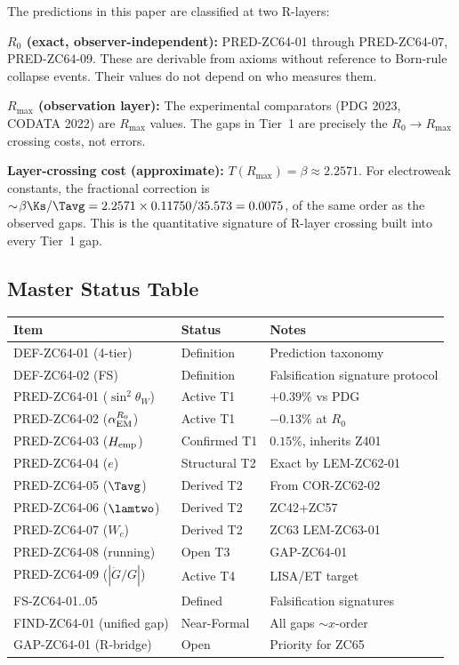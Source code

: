 \documentclass[12pt, a4paper]{article}
\renewcommand{\swsq}{\sin^2\!\theta_W}
\renewcommand{\aEM}{\alpha_{\rm EM}}
\begin{document}
\begin{layerbox}[title={R-Layer Classification of ZC64 Objects}]
The predictions in this paper are classified at two R-layers:

\textbf{$R_0$ (exact, observer-independent):}
PRED-ZC64-01 through PRED-ZC64-07, PRED-ZC64-09.
These are derivable from axioms without reference to
Born-rule collapse events. Their values do not depend
on who measures them.

\textbf{$R_{\max}$ (observation layer):}
The experimental comparators (PDG 2023, CODATA 2022)
are $R_{\max}$ values. The gaps in Tier~1 are precisely
the $R_0 \to R_{\max}$ crossing costs, not errors.

\textbf{Layer-crossing cost (approximate):}
$T(R_{\max}) = \beta \approx 2.2571$.
For electroweak constants, the fractional correction is
$\sim\!\beta\Ks/\Tavg = 2.2571\times 0.11750/35.573 = 0.0075$,
of the same order as the observed gaps.
This is the quantitative signature of R-layer crossing
built into every Tier~1 gap.
\end{layerbox}

\subsection{Master Status Table}
\label{sec:status}

{\small
\begin{center}
\renewcommand{\arraystretch}{1.3}
\begin{tabular}{@{}p{4.0cm}p{2.5cm}p{7.0cm}@{}}
\toprule
\textbf{Item} & \textbf{Status} & \textbf{Notes} \\
\midrule
DEF-ZC64-01 (4-tier) & Definition & Prediction taxonomy \\
DEF-ZC64-02 (FS) & Definition & Falsification signature protocol \\
PRED-ZC64-01 ($\swsq$) & Active T1 & $+0.39\%$ vs PDG \\
PRED-ZC64-02 ($\aEM^{R_0}$) & Active T1 & $-0.13\%$ at $R_0$ \\
PRED-ZC64-03 ($H_{\rm emp}$) & Confirmed T1 & $0.15\%$, inherits Z401 \\
PRED-ZC64-04 ($e$) & Structural T2 & Exact by LEM-ZC62-01 \\
PRED-ZC64-05 ($\Tavg$) & Derived T2 & From COR-ZC62-02 \\
PRED-ZC64-06 ($\lamtwo$) & Derived T2 & ZC42+ZC57 \\
PRED-ZC64-07 ($W_c$) & Derived T2 & ZC63 LEM-ZC63-01 \\
PRED-ZC64-08 (running) & Open T3 & GAP-ZC64-01 \\
PRED-ZC64-09 ($|\dot{G}/G|$) & Active T4 & LISA/ET target \\
FS-ZC64-01..05 & Defined & Falsification signatures \\
FIND-ZC64-01 (unified gap) & Near-Formal & All gaps $\sim x$-order \\
GAP-ZC64-01 (R-bridge) & Open & Priority for ZC65 \\
\bottomrule
\end{tabular}
\end{center}
}
\end{document}

